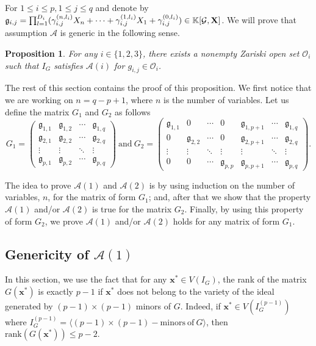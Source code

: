 \documentclass[11pt]{article}
\numberwithin{Property}{section}
\numberwithin{Theorem}{section}
\newtheorem{Proposition}{Proposition}%
\numberwithin{Proposition}{section}
\numberwithin{Lemma}{section}
\numberwithin{Corollary}{section}
\numberwithin{Definition}{section}
\numberwithin{Remark}{section}
\numberwithin{Conjecture}{section}
\numberwithin{Problem}{section}
\numberwithin{Example}{section}
\numberwithin{Claim}{section}
\renewcommand{\leq}{\leqslant}
\newcommand{\field}{\mathbb{K}} %
\begin{document}
For $1 \leq i \leq p, 1 \leq j \leq q$ and denote by $\mathfrak{g}_{i,j} = \prod_{l=1}^{D_i}(\gamma_{i,j}^{(n,l_i)}X_n + \cdots + \gamma_{i,j}^{(1,l_i)}X_1 + \gamma_{i,j}^{(0,l_i)}) \in \field[\mathcal{G}, \bf{X}]$. We will prove that assumption $\mathcal{A}$ is generic in the following sense. 
\begin{Proposition} For any $i \in \{1,2,3\}$, there exists a nonempty Zariski open set $\mathcal{O}_i$ such that $I_G$ satisfies $\mathcal{A}(i)$ for $g_{i,j} \in \mathcal{O}_i$. 
\end{Proposition}

The rest of this section contains the proof of this proposition. We first notice that we are working on $n = q-p+1$, where $n$ is the number of variables. Let us define the matrix $G_1$ and $G_2$ as follows
\[G_1 = \left( \begin{matrix}
\mathfrak{g}_{1,1} & \mathfrak{g}_{1,2} & \cdots  & \mathfrak{g}_{1, q}\\
\mathfrak{g}_{2,1} & \mathfrak{g}_{2,2} & \cdots  & \mathfrak{g}_{2, q}\\
\vdots & \vdots & \ddots & \vdots \\
\mathfrak{g}_{p,1} & \mathfrak{g}_{p,2} & \cdots  & \mathfrak{g}_{p, q}
\end{matrix} \right) \ \mathrm{and} \ 
 G_2 = \left( \begin{matrix}
\mathfrak{g}_{1,1} & 0 & \cdots & 0 & \mathfrak{g}_{1,p+1} & \cdots & \mathfrak{g}_{1, q}\\
0 & \mathfrak{g}_{2,2} & \cdots & 0 & \mathfrak{g}_{2,p+1} & \cdots & \mathfrak{g}_{2, q}\\
\vdots & \vdots & \ddots & \vdots & \vdots & \ddots & \vdots\\
0 & 0 & \cdots & \mathfrak{g}_{p,p} & \mathfrak{g}_{p,p+1} & \cdots & \mathfrak{g}_{p, q}
\end{matrix} \right). \] 

The idea to prove $\mathcal{A}(1)$ and $\mathcal{A}(2)$ is by using induction on the number of variables, $n$, for the matrix of form $G_1$; and, after that we show that the property $\mathcal{A}(1)$ and/or $\mathcal{A}(2)$ is true for the matrix $G_2$. Finally, by using this property of form $G_2$, we prove  $\mathcal{A}(1)$ and/or $\mathcal{A}(2)$ holds for any matrix of form $G_1$. 
\subsection{Genericity of $\mathcal{A}(1)$}
In this section, we use the fact that for any $\mathbf{x}^* \in V(I_G)$, the rank of the matrix $G(\mathbf{x}^*)$ is exactly $p-1$ if $\mathbf{x}^*$ does not belong to the variety of the ideal generated by $(p-1)\times (p-1)$ minors of $G$. Indeed, if $\mathbf{x}^* \in V(I_{G}^{(p-1)})$ where $I_{G}^{(p-1)} = \langle (p-1) \times (p-1) -\mathrm{minors \ of} \ G \rangle$, then $\mathrm{rank}(G(\mathbf{x}^*)) \leq p-2$.
\end{document}
